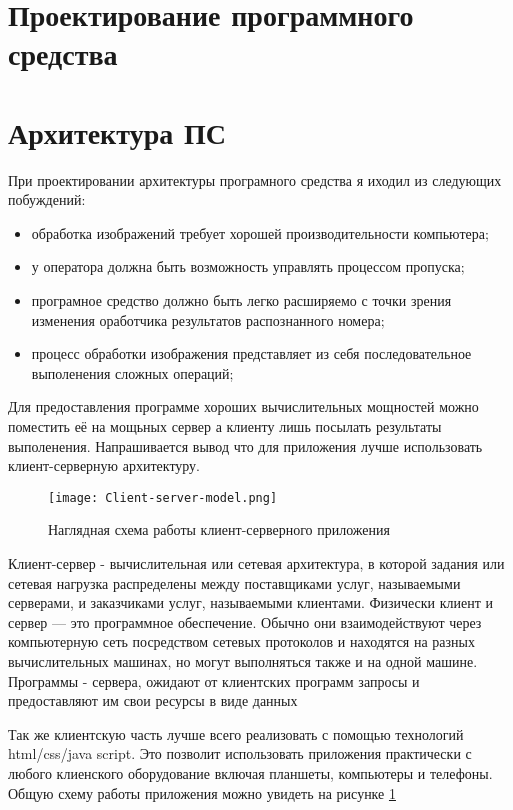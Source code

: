 \section{Проектирование программного средства}
\label{sec:arch}

\section{Архитектура ПС}
\label{sec:arch_arch}

При проектировании архитектуры програмного средства я иходил из следующих побуждений:
\begin{itemize}
	\item обработка изображений требует хорошей производительности компьютера;
	\item у оператора должна быть возможность управлять процессом пропуска;
	\item програмное средство должно быть легко расширяемо с точки зрения изменения оработчика результатов распознанного номера;
	\item процесс обработки изображения представляет из себя последовательное выполенения сложных операций;
\end{itemize}

Для предоставления программе хороших вычислительных мощностей можно поместить её на мощьных сервер а клиенту лишь посылать результаты выполенения. Напрашивается вывод что для приложения лучше использовать клиент-серверную архитектуру. 

\begin{figure}[ht] 
    \centering
    \texttt{[image: Client-server-model.png]}  
    \caption{Наглядная схема работы клиент-серверного приложения}
    \label{fig:arch_arch:client_server}
\end{figure}

Клиент-сервер - вычислительная или сетевая архитектура, в которой задания или сетевая нагрузка распределены между поставщиками услуг, называемыми серверами, и заказчиками услуг, называемыми клиентами. Физически клиент и сервер — это программное обеспечение. Обычно они взаимодействуют через компьютерную сеть посредством сетевых протоколов и находятся на разных вычислительных машинах, но могут выполняться также и на одной машине. Программы - сервера, ожидают от клиентских программ запросы и предоставляют им свои ресурсы в виде данных

Так же клиентскую часть лучше всего реализовать с помощью технологий html/css/java script. Это позволит использовать приложения практически с любого клиенского оборудование включая планшеты, компьютеры и телефоны. Общую схему работы приложения можно увидеть на рисунке \ref{fig:arch_arch:client_server}

